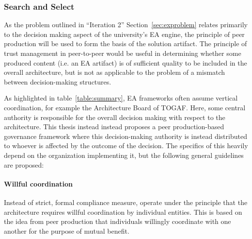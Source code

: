 \subsubsection*{Search and Select}
%
%
As the problem outlined in ``Iteration 2'' Section~\ref{sec:exproblem} relates primarily to the decision making aspect of the university's EA engine, the principle of peer production will be used to form the basis of the solution artifact.  The principle of trust management in peer-to-peer would be useful in determining whether some produced content (i.e. an EA artifact) is of sufficient quality to be included in the overall architecture, but is not as applicable to the problem of a mismatch between decision-making structures. 

As highlighted in table~\ref{table:summary}, EA frameworks often assume vertical coordination, for example the Architecture Board of TOGAF. Here, some central authority is responsible for the overall decision making with respect to the architecture. This thesis instead instead proposes a peer production-based governance framework where this decision-making authority is instead distributed to whoever is affected by the outcome of the decision. The specifics of this heavily depend on the organization implementing it, but the following general guidelines are proposed:

\paragraph*{Willful coordination} Instead of strict, formal compliance measure, operate under the principle that the architecture requires willful coordination by individual entities. This is based on the idea from peer production that individuals willingly coordinate with one another for the purpose of mutual benefit.

